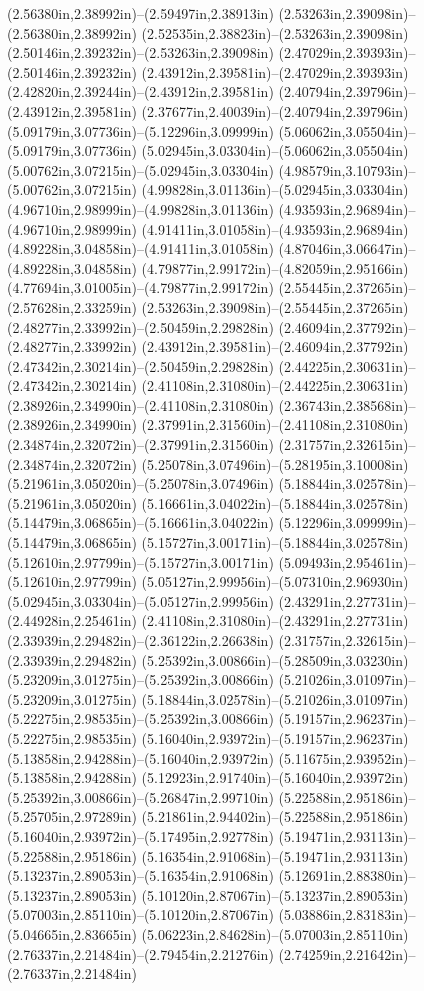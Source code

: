 (2.56380in,2.38992in)--(2.59497in,2.38913in) (2.53263in,2.39098in)--(2.56380in,2.38992in) (2.52535in,2.38823in)--(2.53263in,2.39098in) (2.50146in,2.39232in)--(2.53263in,2.39098in) (2.47029in,2.39393in)--(2.50146in,2.39232in) (2.43912in,2.39581in)--(2.47029in,2.39393in) (2.42820in,2.39244in)--(2.43912in,2.39581in) (2.40794in,2.39796in)--(2.43912in,2.39581in) (2.37677in,2.40039in)--(2.40794in,2.39796in) (5.09179in,3.07736in)--(5.12296in,3.09999in) (5.06062in,3.05504in)--(5.09179in,3.07736in) (5.02945in,3.03304in)--(5.06062in,3.05504in) (5.00762in,3.07215in)--(5.02945in,3.03304in) (4.98579in,3.10793in)--(5.00762in,3.07215in) (4.99828in,3.01136in)--(5.02945in,3.03304in) (4.96710in,2.98999in)--(4.99828in,3.01136in) (4.93593in,2.96894in)--(4.96710in,2.98999in) (4.91411in,3.01058in)--(4.93593in,2.96894in) (4.89228in,3.04858in)--(4.91411in,3.01058in) (4.87046in,3.06647in)--(4.89228in,3.04858in) (4.79877in,2.99172in)--(4.82059in,2.95166in) (4.77694in,3.01005in)--(4.79877in,2.99172in) (2.55445in,2.37265in)--(2.57628in,2.33259in) (2.53263in,2.39098in)--(2.55445in,2.37265in) (2.48277in,2.33992in)--(2.50459in,2.29828in) (2.46094in,2.37792in)--(2.48277in,2.33992in) (2.43912in,2.39581in)--(2.46094in,2.37792in) (2.47342in,2.30214in)--(2.50459in,2.29828in) (2.44225in,2.30631in)--(2.47342in,2.30214in) (2.41108in,2.31080in)--(2.44225in,2.30631in) (2.38926in,2.34990in)--(2.41108in,2.31080in) (2.36743in,2.38568in)--(2.38926in,2.34990in) (2.37991in,2.31560in)--(2.41108in,2.31080in) (2.34874in,2.32072in)--(2.37991in,2.31560in) (2.31757in,2.32615in)--(2.34874in,2.32072in) (5.25078in,3.07496in)--(5.28195in,3.10008in) (5.21961in,3.05020in)--(5.25078in,3.07496in) (5.18844in,3.02578in)--(5.21961in,3.05020in) (5.16661in,3.04022in)--(5.18844in,3.02578in) (5.14479in,3.06865in)--(5.16661in,3.04022in) (5.12296in,3.09999in)--(5.14479in,3.06865in) (5.15727in,3.00171in)--(5.18844in,3.02578in) (5.12610in,2.97799in)--(5.15727in,3.00171in) (5.09493in,2.95461in)--(5.12610in,2.97799in) (5.05127in,2.99956in)--(5.07310in,2.96930in) (5.02945in,3.03304in)--(5.05127in,2.99956in) (2.43291in,2.27731in)--(2.44928in,2.25461in) (2.41108in,2.31080in)--(2.43291in,2.27731in) (2.33939in,2.29482in)--(2.36122in,2.26638in) (2.31757in,2.32615in)--(2.33939in,2.29482in) (5.25392in,3.00866in)--(5.28509in,3.03230in) (5.23209in,3.01275in)--(5.25392in,3.00866in) (5.21026in,3.01097in)--(5.23209in,3.01275in) (5.18844in,3.02578in)--(5.21026in,3.01097in) (5.22275in,2.98535in)--(5.25392in,3.00866in) (5.19157in,2.96237in)--(5.22275in,2.98535in) (5.16040in,2.93972in)--(5.19157in,2.96237in) (5.13858in,2.94288in)--(5.16040in,2.93972in) (5.11675in,2.93952in)--(5.13858in,2.94288in) (5.12923in,2.91740in)--(5.16040in,2.93972in) (5.25392in,3.00866in)--(5.26847in,2.99710in) (5.22588in,2.95186in)--(5.25705in,2.97289in) (5.21861in,2.94402in)--(5.22588in,2.95186in) (5.16040in,2.93972in)--(5.17495in,2.92778in) (5.19471in,2.93113in)--(5.22588in,2.95186in) (5.16354in,2.91068in)--(5.19471in,2.93113in) (5.13237in,2.89053in)--(5.16354in,2.91068in) (5.12691in,2.88380in)--(5.13237in,2.89053in) (5.10120in,2.87067in)--(5.13237in,2.89053in) (5.07003in,2.85110in)--(5.10120in,2.87067in) (5.03886in,2.83183in)--(5.04665in,2.83665in) (5.06223in,2.84628in)--(5.07003in,2.85110in) (2.76337in,2.21484in)--(2.79454in,2.21276in) (2.74259in,2.21642in)--(2.76337in,2.21484in) 